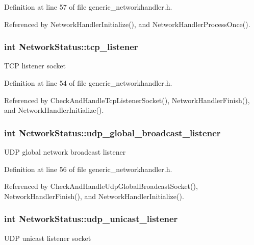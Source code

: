 \-Definition at line 57 of file generic\-\_\-networkhandler.\-h.



\-Referenced by \-Network\-Handler\-Initialize(), and \-Network\-Handler\-Process\-Once().

\hypertarget{structNetworkStatus_ac66cc7ac2af61a23198ca5adc88c80e7}{
\subsubsection[{tcp\-\_\-listener}]{\setlength{\rightskip}{0pt plus 5cm}int {\bf \-Network\-Status\-::tcp\-\_\-listener}}}\label{df/d80/structNetworkStatus_ac66cc7ac2af61a23198ca5adc88c80e7}
\-T\-C\-P listener socket 

\-Definition at line 54 of file generic\-\_\-networkhandler.\-h.



\-Referenced by \-Check\-And\-Handle\-Tcp\-Listener\-Socket(), \-Network\-Handler\-Finish(), and \-Network\-Handler\-Initialize().

\hypertarget{structNetworkStatus_a633b353c84264794069fa8951f22e754}{
\subsubsection[{udp\-\_\-global\-\_\-broadcast\-\_\-listener}]{\setlength{\rightskip}{0pt plus 5cm}int {\bf \-Network\-Status\-::udp\-\_\-global\-\_\-broadcast\-\_\-listener}}}\label{df/d80/structNetworkStatus_a633b353c84264794069fa8951f22e754}
\-U\-D\-P global network broadcast listener 

\-Definition at line 56 of file generic\-\_\-networkhandler.\-h.



\-Referenced by \-Check\-And\-Handle\-Udp\-Global\-Broadcast\-Socket(), \-Network\-Handler\-Finish(), and \-Network\-Handler\-Initialize().

\hypertarget{structNetworkStatus_aeb6f839f93df9d0b639415702f68c811}{
\subsubsection[{udp\-\_\-unicast\-\_\-listener}]{\setlength{\rightskip}{0pt plus 5cm}int {\bf \-Network\-Status\-::udp\-\_\-unicast\-\_\-listener}}}\label{df/d80/structNetworkStatus_aeb6f839f93df9d0b639415702f68c811}
\-U\-D\-P unicast listener socket 

